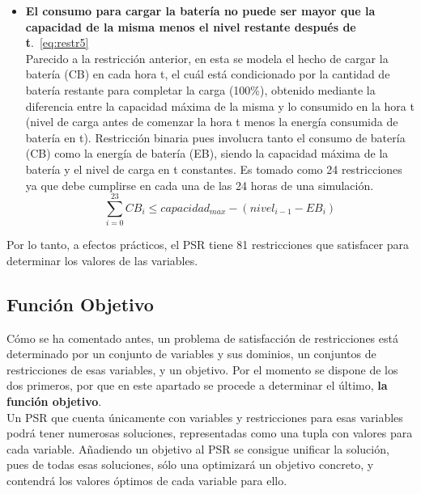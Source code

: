 \begin{itemize}
\item \textbf{El consumo para cargar la batería no puede ser mayor que la capacidad de la misma menos el nivel restante después de t}.~\ref{eq:restr5}\\Parecido a la restricción anterior, en esta se modela el hecho de cargar la batería (CB) en cada hora t, el cuál está condicionado por la cantidad de batería restante para completar la carga (100\%), obtenido mediante la diferencia entre la capacidad máxima de la misma y lo consumido en la hora t (nivel de carga antes de comenzar la hora t menos la energía consumida de batería en t). Restricción binaria pues involucra tanto el consumo de batería (CB) como la energía de batería (EB), siendo la capacidad máxima de la batería y el nivel de carga en t constantes. Es tomado como 24 restricciones ya que debe cumplirse en cada una de las 24 horas de una simulación.
\begin{equation}
        \label{eq:restr5}
        \sum_{i=0}^{23} CB_{i} \leq capacidad_{max}- (nivel_{i-1} - EB_{i})
\end{equation}

\end{itemize}

Por lo tanto, a efectos prácticos, el PSR tiene 81 restricciones que satisfacer para determinar los valores de las variables.

\subsection{Función Objetivo}
Cómo se ha comentado antes, un problema de satisfacción de restricciones está determinado por un conjunto de variables y sus dominios, un conjuntos de restricciones de esas variables, y un objetivo. Por el momento se dispone de los dos primeros, por que en este apartado se procede a determinar el último, \textbf{la función objetivo}.\\

Un PSR que cuenta únicamente con variables y restricciones para esas variables podrá tener numerosas soluciones, representadas como una tupla con valores para cada variable. Añadiendo un objetivo al PSR se consigue unificar la solución, pues de todas esas soluciones, sólo una optimizará un objetivo concreto, y contendrá los valores óptimos de cada variable para ello.\\

